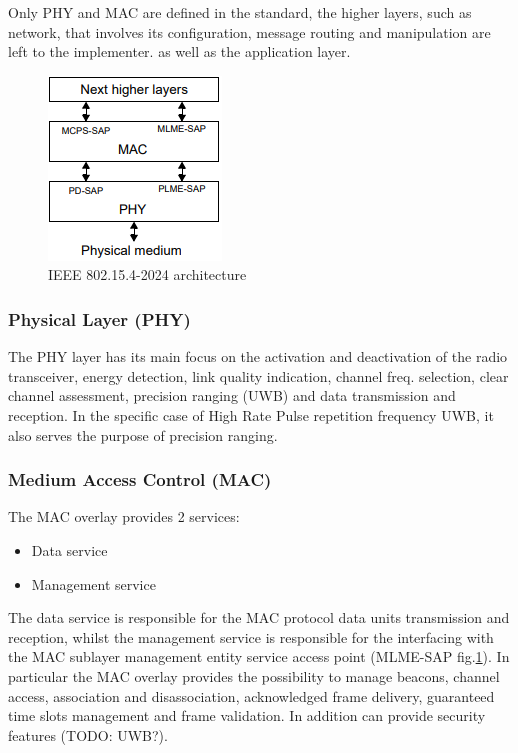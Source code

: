 \documentclass[conference]{IEEEtran}
\begin{document}
Only PHY and MAC are defined in the standard\cite{10794632}, the higher layers, such as network,
that involves its configuration, message routing and manipulation are left to the implementer.
as well as the application layer.\\

\begin{figure}[!h]
  \centering
  \includegraphics[width=.5\linewidth]{layers}
  \caption{IEEE 802.15.4-2024 architecture}
  \label{fig:layers}
\end{figure}

\subsubsection{Physical Layer (PHY)}
The PHY layer has its main focus on the activation and deactivation of the radio transceiver,
energy detection, link quality indication, channel freq. selection, clear channel assessment,
precision ranging (UWB) and data transmission and reception.
In the specific case of High Rate Pulse repetition frequency UWB, it also serves the purpose 
of precision ranging.

\subsubsection{Medium Access Control (MAC)}
The MAC overlay provides 2 services:
\begin{itemize}
    \item Data service
    \item Management service
\end{itemize}
The data service is responsible for the MAC protocol data units transmission and reception,
whilst the management service is responsible for the interfacing with the MAC sublayer 
management entity service access point (MLME-SAP fig.\ref{fig:layers}).
In particular the MAC overlay provides the possibility to manage beacons, channel access,
association and disassociation, acknowledged frame delivery, guaranteed time slots management
and frame validation. In addition can provide security features (TODO: UWB?).
\end{document}
